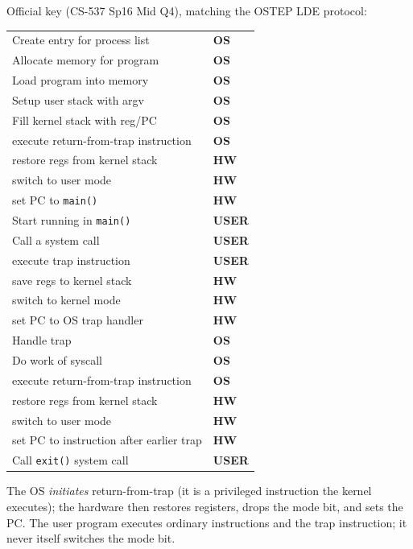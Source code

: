 \documentclass[11pt,a4paper]{article}
\newenvironment{Sol}{%
  \begin{tcolorbox}[sboxstyle, title={Solution}]%
}{%
  \end{tcolorbox}\vspace{0.35em}%
}
\begin{document}
\begin{Sol}
Official key (CS-537 Sp16 Mid Q4), matching the OSTEP LDE protocol:
\begin{center}
\begin{tabular}{ll}
Create entry for process list & \textbf{OS} \\
Allocate memory for program & \textbf{OS} \\
Load program into memory & \textbf{OS} \\
Setup user stack with argv & \textbf{OS} \\
Fill kernel stack with reg/PC & \textbf{OS} \\
execute return-from-trap instruction & \textbf{OS} \\
restore regs from kernel stack & \textbf{HW} \\
switch to user mode & \textbf{HW} \\
set PC to \texttt{main()} & \textbf{HW} \\
Start running in \texttt{main()} & \textbf{USER} \\
Call a system call & \textbf{USER} \\
execute trap instruction & \textbf{USER} \\
save regs to kernel stack & \textbf{HW} \\
switch to kernel mode & \textbf{HW} \\
set PC to OS trap handler & \textbf{HW} \\
Handle trap & \textbf{OS} \\
Do work of syscall & \textbf{OS} \\
execute return-from-trap instruction & \textbf{OS} \\
restore regs from kernel stack & \textbf{HW} \\
switch to user mode & \textbf{HW} \\
set PC to instruction after earlier trap & \textbf{HW} \\
Call \texttt{exit()} system call & \textbf{USER} \\
\end{tabular}
\end{center}
The OS \emph{initiates} return-from-trap (it is a privileged instruction the kernel executes); the hardware then restores registers, drops the mode bit, and sets the PC. The user program executes ordinary instructions and the trap instruction; it never itself switches the mode bit.
\end{Sol}
\end{document}
